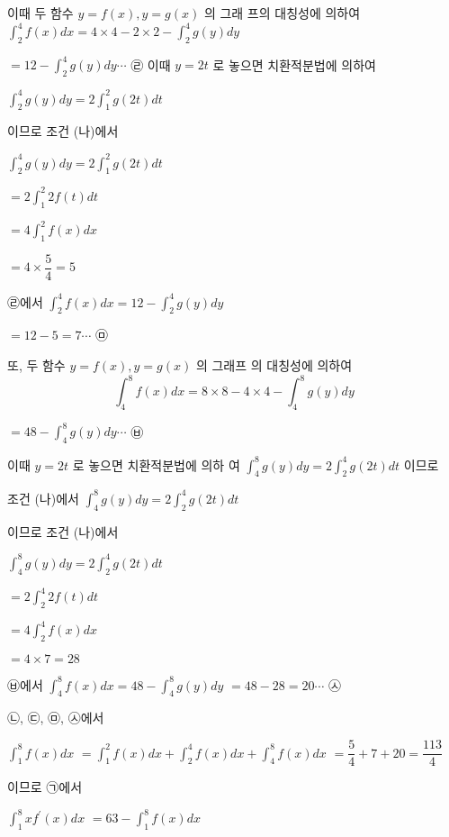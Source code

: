 \documentclass{oblivoir}
\begin{document}
이때 두 함수 $y=f(x), y=g(x)$ 의 그래
프의 대칭성에 의하여
$\displaystyle\int_{2}^{4} f(x) d x=4 \times 4-2 \times 2-\displaystyle\int_{2}^{4} g(y) d y$

$=12-\displaystyle\int_{2}^{4} g(y) d y \cdots$ ㉣
이때 $y=2 t$ 로 놓으면 치환적분법에 의하여

$\displaystyle\int_{2}^{4} g(y) d y=2 \displaystyle\int_{1}^{2} g(2 t) d t$

이므로 조건 (나)에서

$\displaystyle\int_{2}^{4} g(y) d y=2 \displaystyle\int_{1}^{2} g(2 t) d t$

$=2 \displaystyle\int_{1}^{2} 2 f(t) d t$

$=4 \displaystyle\int_{1}^{2} f(x) d x$

$=4 \times \dfrac{5}{4}=5$

㉣에서
$\displaystyle\int_{2}^{4} f(x) d x=12-\displaystyle\int_{2}^{4} g(y) d y$

$=12-5=7 \cdots$ ㉤

또, 두 함수 $y=f(x), y=g(x)$ 의 그래프 의 대칭성에 의하여
$$
\displaystyle\int_{4}^{8} f(x) d x=8 \times 8-4 \times 4-\displaystyle\int_{4}^{8} g(y) d y
$$

$=48-\displaystyle\int_{4}^{8} g(y) d y \cdots$ ㉥

이때 $y=2 t$ 로 놓으면 치환적분법에 의하 여 $\displaystyle\int_{4}^{8} g(y) d y=2 \displaystyle\int_{2}^{4} g(2 t) d t$ 이므로 

조건 (나)에서 $\displaystyle\int_{4}^{8} g(y) d y=2 \displaystyle\int_{2}^{4} g(2 t) d t$

이므로 조건 (나)에서

$\displaystyle\int_{4}^{8} g(y) d y=2 \displaystyle\int_{2}^{4} g(2 t) d t$

$=2 \displaystyle\int_{2}^{4} 2 f(t) d t$

$=4 \displaystyle\int_{2}^{4} f(x) d x$

$=4 \times 7=28$

㉥에서 $\displaystyle\int_{4}^{8} f(x) d x=48-\displaystyle\int_{4}^{8} g(y) d y$ $=48-28=20 \cdots$ ㉦

㉡, ㉢, ㉤, ㉦에서

$\displaystyle\int_{1}^{8} f(x) d x$ $=\displaystyle\int_{1}^{2} f(x) d x+\displaystyle\int_{2}^{4} f(x) d x+\displaystyle\int_{4}^{8} f(x) d x$ $=\dfrac{5}{4}+7+20=\dfrac{113}{4}$

이므로 ㉠에서

$\displaystyle\int_{1}^{8} x f^{\prime}(x) d x$ $=63-\displaystyle\int_{1}^{8} f(x) d x$
\end{document}
